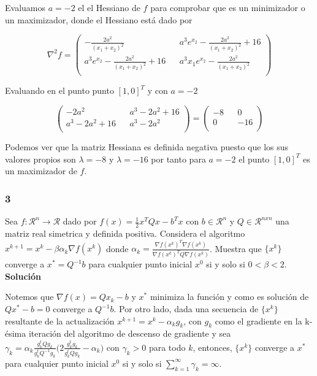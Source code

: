 \documentclass[conference]{IEEEtran}
\begin{document}
Evaluamos $a=-2$ el el Hessiano de $f$ para comprobar que es un minimizador o un maximizador,
donde el Hessiano está dado por

$$
\nabla^2 f =
\begin{pmatrix}
	- \frac{2a^2}{(x_1 + x_2)^2} && a^3e^{x_2} - \frac{2a^2}{(x_1 + x_2)^2} + 16 \\
	a^3 e^{x_2} - \frac{2a^2}{(x_1 + x_2)^2} + 16 && a^3 x_1 e^{x_2} - \frac{2a^2}{(x_1 + x_2)^2} \\
\end{pmatrix}
$$

Evaluando en el punto punto $[1, 0]^T$ y con $a=-2$

$$
\begin{pmatrix}
	- 2a^2 && a^3 - 2a^2 + 16 \\
	a^3 - 2a^2 + 16 && a^3 - 2a^2 \\
\end{pmatrix}
=
\begin{pmatrix}
	-8 && 0 \\
	0 && -16 \\
\end{pmatrix}
$$

Podemos ver que la matriz Hessiana es definida negativa puesto que los sus
valores propios son $\lambda = -8$ y $\lambda = -16$ por tanto para $a=-2$ el
punto $[1, 0]^T$ es un maximizador de $f$. \\


\subsubsection*{3}

Sea $f: \mathcal{R}^n \rightarrow \mathcal{R}$ dado por $f(x) = \frac{1}{2}x^TQx - b^Tx$
con $b \in \mathcal{R}^n$ y $Q \in \mathcal{R}^{nxn}$ una matriz real simetrica y
definida positiva. Considera el algoritmo $x^{k+1} = x^k - \beta \alpha_k \nabla f(x^k)$
donde $\alpha_k = \frac{\nabla f(x^k)^T \nabla f(x^k) }{\nabla f(x^k)^T Q \nabla f(x^k)}$.
Muestra que $\{x^k\}$ converge a $x^* = Q^{-1}b$ para cualquier punto inicial $x^0$
si y solo si $0 < \beta < 2$. \\

\textbf{Solución}

Notemos que $\nabla f(x) = Qx_k - b$ y $x^*$ minimiza la función y como es
solución de $Qx^* - b = 0$  converge a $Q^{-1}b$. Por otro lado, dada una
secuencia de  $\{x^k\}$ resultante de la actualización
$x^{k+1} = x^{k} - \alpha_k g_k$, con $g_k$ como el gradiente en la k-ésima
iteración del algoritmo de descenso de gradiente y sea
$\gamma_k = \alpha_k \frac{g_k^tQg_k}{g_k^tQ^{-1}g_k} \big(2\frac{g_k^tg_k}{g_k^tQg_k} - \alpha_k \big)$
con $\gamma_k > 0$ para todo $k$, entonces, $\{x^k\}$ converge a $x^*$ para
cualquier punto inicial $x^0$ si y solo si
$\sum_{k=1}^{\infty} \gamma_k = \infty$. \
\end{document}

